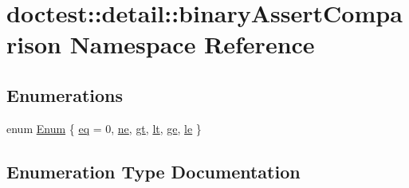 \hypertarget{namespacedoctest_1_1detail_1_1binary_assert_comparison}{}\section{doctest\+:\+:detail\+:\+:binary\+Assert\+Comparison Namespace Reference}
\label{namespacedoctest_1_1detail_1_1binary_assert_comparison}
\subsection*{Enumerations}
\begin{DoxyCompactItemize}
\item 
enum \mbox{\hyperlink{namespacedoctest_1_1detail_1_1binary_assert_comparison_a2117cafa5b007d26f2e0988f3a081569}{Enum}} \{ \newline
\mbox{\hyperlink{namespacedoctest_1_1detail_1_1binary_assert_comparison_a2117cafa5b007d26f2e0988f3a081569af644d2e3091c342ab78b12da1fcb06dc}{eq}} = 0, 
\mbox{\hyperlink{namespacedoctest_1_1detail_1_1binary_assert_comparison_a2117cafa5b007d26f2e0988f3a081569a851b5dd9ab390a406621216da112ac9c}{ne}}, 
\mbox{\hyperlink{namespacedoctest_1_1detail_1_1binary_assert_comparison_a2117cafa5b007d26f2e0988f3a081569a3efb665f41cd9490d9739e1ad228918e}{gt}}, 
\mbox{\hyperlink{namespacedoctest_1_1detail_1_1binary_assert_comparison_a2117cafa5b007d26f2e0988f3a081569aea0e8621512e05d78d88ff2d2c164a6b}{lt}}, 
\newline
\mbox{\hyperlink{namespacedoctest_1_1detail_1_1binary_assert_comparison_a2117cafa5b007d26f2e0988f3a081569a1de9460fcfb6a1681f13d54083f88313}{ge}}, 
\mbox{\hyperlink{namespacedoctest_1_1detail_1_1binary_assert_comparison_a2117cafa5b007d26f2e0988f3a081569a58efccb94f787a00914adc6db077347b}{le}}
 \}
\end{DoxyCompactItemize}


\subsection{Enumeration Type Documentation}
\mbox{\label{namespacedoctest_1_1detail_1_1binary_assert_comparison_a2117cafa5b007d26f2e0988f3a081569}} 
